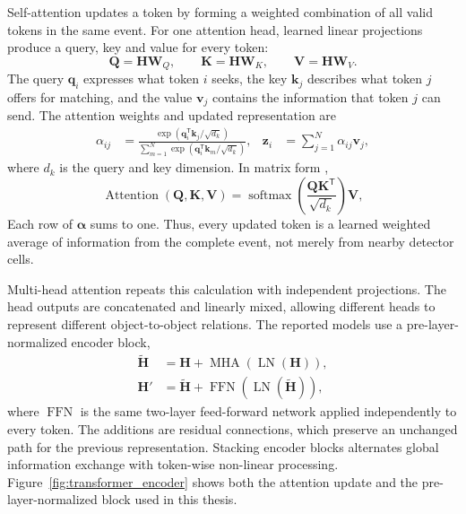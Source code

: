 Self-attention updates a token by forming a weighted combination of all valid
tokens in the same event. For one attention head, learned linear projections
produce a query, key and value for every token:
\begin{equation}
    \mathbf{Q}=\mathbf{H}\mathbf{W}_Q,
    \qquad
    \mathbf{K}=\mathbf{H}\mathbf{W}_K,
    \qquad
    \mathbf{V}=\mathbf{H}\mathbf{W}_V.
    \label{eq:transformer_qkv}
\end{equation}
The query \(\mathbf{q}_i\) expresses what token \(i\) seeks, the key
\(\mathbf{k}_j\) describes what token \(j\) offers for matching, and the value
\(\mathbf{v}_j\) contains the information that token \(j\) can send. The
attention weights and updated representation are
\begin{align}
    \alpha_{ij}
    &=
    \frac{
        \exp(\mathbf{q}_i^{\mathsf T}\mathbf{k}_j/\sqrt{d_k})
    }{
        \sum_{m=1}^{N}
        \exp(\mathbf{q}_i^{\mathsf T}\mathbf{k}_m/\sqrt{d_k})
    },
    &
    \mathbf{z}_i
    &=
    \sum_{j=1}^{N}\alpha_{ij}\mathbf{v}_j ,
    \label{eq:token_attention}
\end{align}
where \(d_k\) is the query and key dimension. In matrix form
\cite{vaswani2017attention},
\begin{equation}
    \operatorname{Attention}(\mathbf{Q},\mathbf{K},\mathbf{V})
    =
    \operatorname{softmax}
    \!\left(
        \frac{\mathbf{Q}\mathbf{K}^{\mathsf{T}}}{\sqrt{d_k}}
    \right)
    \mathbf{V},
    \label{eq:scaled_dot_product_attention}
\end{equation}
Each row of \(\boldsymbol{\alpha}\) sums to one.
Thus, every updated token is a learned weighted average of information from
the complete event, not merely from nearby detector cells.

Multi-head attention repeats this calculation with independent projections.
The head outputs are concatenated and linearly mixed, allowing different
heads to represent different object-to-object relations. The reported models
use a pre-layer-normalized encoder block,
\begin{align}
    \widetilde{\mathbf{H}}
    &=
    \mathbf{H}
    +
    \operatorname{MHA}\!\left(\operatorname{LN}(\mathbf{H})\right),
    \label{eq:preln_attention}\\
    \mathbf{H}'
    &=
    \widetilde{\mathbf{H}}
    +
    \operatorname{FFN}\!\left(
        \operatorname{LN}(\widetilde{\mathbf{H}})
    \right),
    \label{eq:preln_ffn}
\end{align}
where \(\operatorname{FFN}\) is the same two-layer feed-forward network
applied independently to every token. The additions are residual connections,
which preserve an unchanged path for the previous representation. Stacking
encoder blocks alternates global information exchange with token-wise
non-linear processing. Figure~\ref{fig:transformer_encoder} shows both the
attention update and the pre-layer-normalized block used in this thesis.


